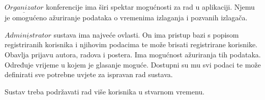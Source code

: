 		$\underline{Organizator}$ konferencije ima širi spektar mogućnosti za rad u aplikaciji. Njemu je omogućeno ažuriranje podataka o vremenima izlaganja i pozvanih izlagača. 
		
		$\underline{Administrator}$ sustava ima najveće ovlasti. On ima pristup bazi s popisom registriranih korisnika i njihovim podacima te može brisati registrirane korisnike. Obavlja prijavu autora, radova i postera. Ima mogućnost ažuriranja tih podataka. Određuje vrijeme u kojem je glasanje moguće. Dostupni su mu svi podaci te može definirati sve potrebne uvjete za ispravan rad sustava. 

		
		Sustav treba podržavati rad više korisnika u stvarnom vremenu. 

		
		\eject
		

